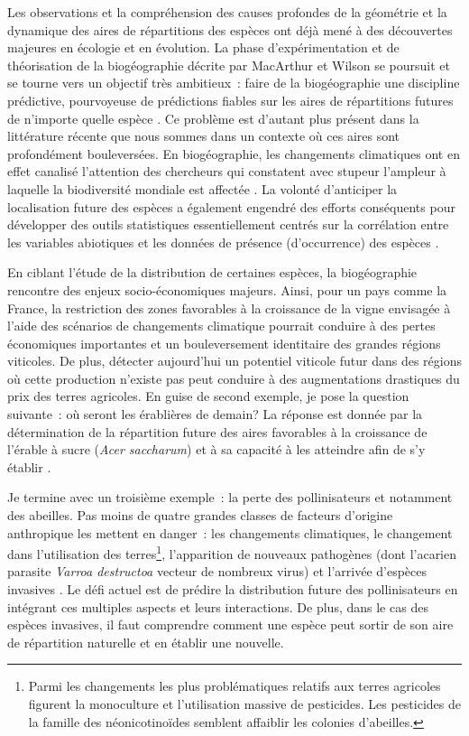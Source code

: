Les observations et la compréhension des causes profondes de la
géométrie et la dynamique des aires de répartitions des espèces ont déjà
mené à des découvertes majeures en écologie et en évolution. La phase
d'expérimentation et de théorisation de la biogéographie décrite par
MacArthur et Wilson se poursuit et se tourne vers un objectif très
ambitieux~: faire de la biogéographie une discipline prédictive,
pourvoyeuse de prédictions fiables sur les aires de répartitions futures
de n'importe quelle espèce \citep{Mouquet2015, Warren2015}. Ce problème
est d'autant plus présent dans la littérature récente que nous sommes
dans un contexte où ces aires sont profondément bouleversées. En
biogéographie, les changements climatiques ont en effet canalisé
l'attention des chercheurs qui constatent avec stupeur l'ampleur à
laquelle la biodiversité mondiale est affectée
\citep{Koh2004, Bellard2012}. La volonté d'anticiper la localisation
future des espèces a également engendré des efforts conséquents pour
développer des outils statistiques essentiellement centrés sur la
corrélation entre les variables abiotiques et les données de présence
(d'occurrence) des espèces \citep{Elith2006}.

En ciblant l'étude de la distribution de certaines espèces, la
biogéographie rencontre des enjeux socio-économiques majeurs. Ainsi,
pour un pays comme la France, la restriction des zones favorables à la
croissance de la vigne envisagée à l'aide des scénarios de changements
climatique \citep{Hannah2013} pourrait conduire à des pertes économiques
importantes et un bouleversement identitaire des grandes régions
viticoles. De plus, détecter aujourd'hui un potentiel viticole futur
dans des régions où cette production n'existe pas peut conduire à des
augmentations drastiques du prix des terres agricoles. En guise de
second exemple, je pose la question suivante~: où seront les érablières
de demain? La réponse est donnée par la détermination de la répartition
future des aires favorables à la croissance de l'érable à sucre
(\emph{Acer saccharum}) et à sa capacité à les atteindre afin de s'y
établir \citep{Solarik2016}.

Je termine avec un troisième exemple~: la perte des pollinisateurs et
notamment des abeilles. Pas moins de quatre grandes classes de facteurs
d'origine anthropique les mettent en danger~: les changements
climatiques, le changement dans l'utilisation des terres\footnote{Parmi
  les changements les plus problématiques relatifs aux terres agricoles
  figurent la monoculture et l'utilisation massive de pesticides. Les
  pesticides de la famille des néonicotinoïdes semblent affaiblir les
  colonies d'abeilles.}, l'apparition de nouveaux pathogènes (dont
l'acarien parasite \emph{Varroa destructoa} vecteur de nombreux virus)
et l'arrivée d'espèces invasives \citep[comme le frelon
asiatique][]{Vanbergen2013}. Le défi actuel est de prédire la
distribution future des pollinisateurs en intégrant ces multiples
aspects et leurs interactions. De plus, dans le cas des espèces
invasives, il faut comprendre comment une espèce peut sortir de son aire
de répartition naturelle et en établir une nouvelle.

